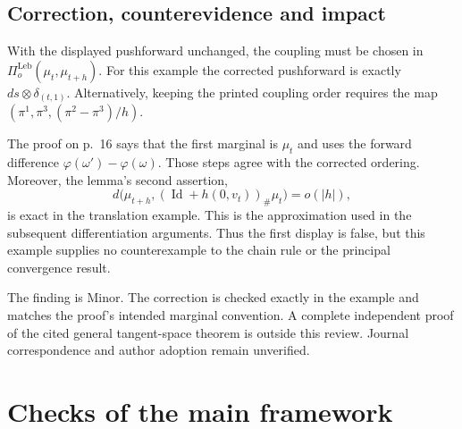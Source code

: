 \documentclass[10pt]{article}
\begin{document}
\subsection*{Correction, counterevidence and impact}
With the displayed pushforward unchanged, the coupling must be chosen in \(\Pi_o^{\mathrm{Leb}}(\mu_t,\mu_{t+h})\). For this example the corrected pushforward is exactly \(ds\otimes\delta_{(t,1)}\). Alternatively, keeping the printed coupling order requires the map \((\pi^1,\pi^3,(\pi^2-\pi^3)/h)\).\par
The proof on p. 16 says that the first marginal is \(\mu_t\) and uses the forward difference \(\varphi(\omega')-\varphi(\omega)\). Those steps agree with the corrected ordering. Moreover, the lemma’s second assertion, \[d\bigl(\mu_{t+h},(\operatorname{Id}+h(0,v_t))_\#\mu_t\bigr)=o(|h|),\] is exact in the translation example. This is the approximation used in the subsequent differentiation arguments. Thus the first display is false, but this example supplies no counterexample to the chain rule or the principal convergence result.\par
The finding is Minor. The correction is checked exactly in the example and matches the proof’s intended marginal convention. A complete independent proof of the cited general tangent-space theorem is outside this review. Journal correspondence and author adoption remain unverified.\par
\section*{Checks of the main framework}
\end{document}
